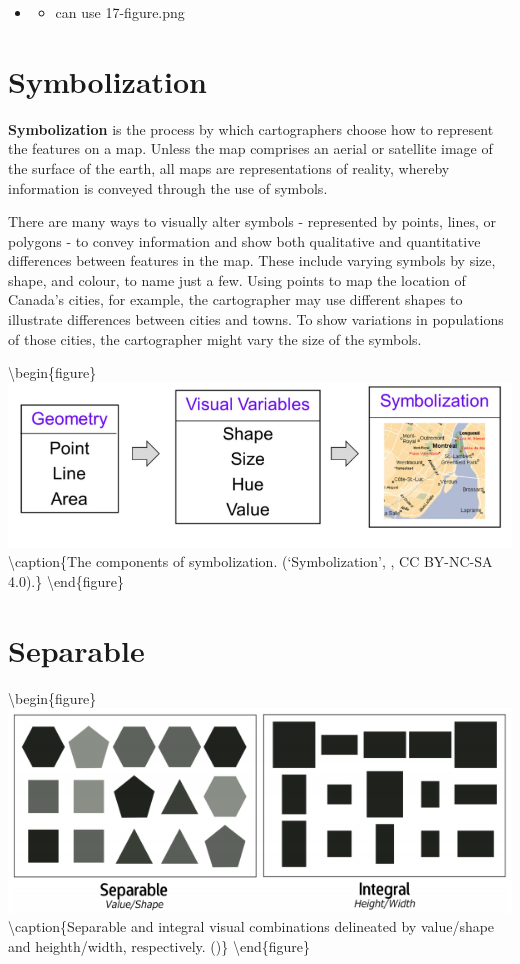\documentclass[
]{book}
\providecommand{\tightlist}{%
  \setlength{\itemsep}{0pt}\setlength{\parskip}{0pt}}
\begin{document}
\begin{itemize}
\item
  \begin{itemize}
  \tightlist
  \item
    can use 17-figure.png
  \end{itemize}
\end{itemize}

\hypertarget{symbolization}{%
\section{Symbolization}\label{symbolization}}

\textbf{Symbolization} is the process by which cartographers choose how to represent the features on a map. Unless the map comprises an aerial or satellite image of the surface of the earth, all maps are representations of reality, whereby information is conveyed through the use of symbols.

There are many ways to visually alter symbols - represented by points, lines, or polygons - to convey information and show both qualitative and quantitative differences between features in the map. These include varying symbols by size, shape, and colour, to name just a few. Using points to map the location of Canada's cities, for example, the cartographer may use different shapes to illustrate differences between cities and towns. To show variations in populations of those cities, the cartographer might vary the size of the symbols.

\textbackslash begin\{figure\}
\includegraphics[width=0.8\linewidth]{images/17-symbolization} \textbackslash caption\{The components of symbolization. (`Symbolization', \citet{manson_symbolization_2013}, CC BY-NC-SA 4.0).\}\label{fig:17-symbolization}
\textbackslash end\{figure\}

\hypertarget{separable}{%
\section{Separable}\label{separable}}

\textbackslash begin\{figure\}
\includegraphics[width=0.8\linewidth]{images/17-separable} \textbackslash caption\{Separable and integral visual combinations delineated by value/shape and heighth/width, respectively. (\citet{elmer_symbol_2012})\}\label{fig:17-separable}
\textbackslash end\{figure\}
\end{document}
